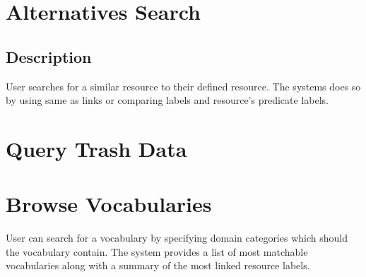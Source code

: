 \section{Alternatives Search}
\subsection{Description}
User searches for a similar resource to their defined resource. The systems does so by using same as links or comparing labels and resource's predicate labels.

\section{Query Trash Data}



\section{Browse Vocabularies}
User can search for a vocabulary by specifying domain categories which should the vocabulary contain. The system  provides a list of most matchable vocabularies along with a summary of the most linked resource labels.



